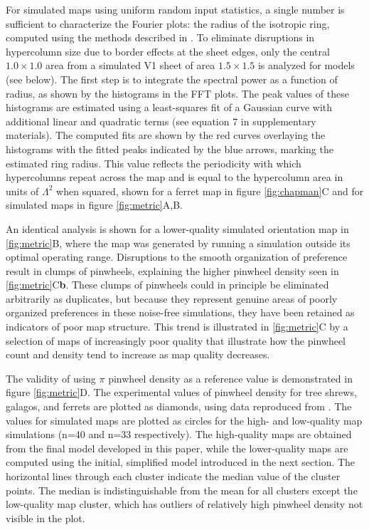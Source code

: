 \documentclass{article}
\begin{document}
For simulated maps using uniform random input statistics, a single number
is sufficient to characterize the Fourier plots: the radius of the
isotropic ring, computed using the methods described in
\citet{Kaschube2010}.  To eliminate disruptions in hypercolumn size
due to border effects at the sheet edges, only the central $1.0\times1.0$ area
from a simulated V1 sheet of area $1.5\times1.5$ is analyzed for models (see
below). The first step is to integrate the spectral power as a
function of radius, as shown by the histograms in the FFT plots. The
peak values of these histograms are estimated using a least-squares
fit of a Gaussian curve with additional linear and quadratic
terms (see equation 7 in \citealp{Kaschube2010} supplementary
materials). The computed fits are shown by the red curves overlaying the
histograms with the fitted peaks indicated by the blue arrows, marking
the estimated ring radius. This value reflects the periodicity with
which hypercolumns repeat across the map and is equal to the
hypercolumn area in units of $\Lambda^2$ when squared, shown for a
ferret map in figure \ref{fig:chapman}C and for simulated maps in
figure \ref{fig:metric}A,B.

An identical analysis is shown for a lower-quality simulated
orientation map in \ref{fig:metric}B, where the map was generated by
running a simulation outside its optimal operating range. Disruptions
to the smooth organization of preference result in clumps of
pinwheels, explaining the higher pinwheel density seen in
\ref{fig:metric}C{\bf b}. These clumps of pinwheels could in principle be
eliminated arbitrarily as duplicates, but because they represent genuine areas of
poorly organized preferences in these noise-free simulations, they
have been retained as indicators of poor map structure. This trend is
illustrated in \ref{fig:metric}C by a selection of maps of
increasingly poor quality that illustrate how the pinwheel count and
density tend to increase as map quality decreases.

The validity of using $\pi$ pinwheel density as a reference value is
demonstrated in figure \ref{fig:metric}D. The experimental values of
pinwheel density for tree shrews, galagos, and ferrets
are plotted as diamonds, using data reproduced
from \citet{Kaschube2010}. The values for simulated maps are plotted as
circles for the high- and low-quality map simulations (n=40 and n=33
respectively). The high-quality maps are obtained from the final model
developed in this paper, while the lower-quality maps are computed
using the initial, simplified model introduced in the next
section. The horizontal lines through each cluster indicate the median
value of the cluster points. The median is indistinguishable from the
mean for all clusters except the low-quality map cluster, which has
outliers of relatively high pinwheel density not visible in the plot.
\end{document}
